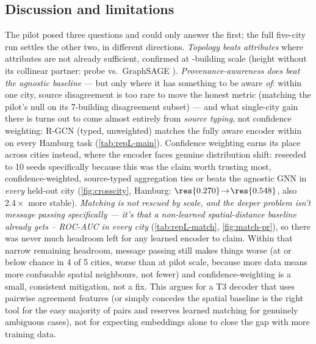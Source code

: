 \subsection{Discussion and limitations}
\label{sec:repL:discussion}
The pilot posed three questions and could only answer the first; the full
five-city run settles the other two, in different directions. \emph{Topology
beats attributes} where attributes are not already sufficient, confirmed at
-building scale (height without its collinear partner: probe
 vs.\ GraphSAGE ). \emph{Provenance-awareness does beat
the agnostic baseline} --- but only where it has something to be aware
\emph{of}: within one city, source disagreement is too rare to move the
honest metric (matching the pilot's null on its 7-building disagreement
subset) --- and what single-city gain there is turns out to come almost
entirely from \emph{source typing}, not confidence weighting: R-GCN (typed,
unweighted) matches the fully aware encoder within  on every Hamburg
task (\cref{tab:repL-main}). Confidence weighting earns its place across
cities instead, where the encoder faces genuine distribution shift: reseeded
to 10 seeds specifically because this was the claim worth trusting most,
confidence-weighted, source-typed aggregation ties or beats the agnostic GNN
in \emph{every} held-out city (\cref{fig:crosscity}, Hamburg:
$\res{0.270}\!\to\!\res{0.548}$, also $2.4\times$ more stable). \emph{Matching
is not rescued by scale, and the deeper problem isn't message passing
specifically --- it's that a non-learned spatial-distance baseline already
gets -- ROC-AUC in every city} (\cref{tab:repL-match},
\cref{fig:match-pr}), so there was never much headroom left for any learned
encoder to claim. Within that narrow remaining headroom, message passing still
makes things worse (at or below chance in 4 of 5 cities, worse than at pilot
scale, because more data means more confusable spatial neighbours, not fewer)
and confidence-weighting is a small, consistent mitigation, not a fix. This
argues for a T3 decoder that uses pairwise agreement features (or simply
concedes the spatial baseline is the right tool for the easy majority of
pairs and reserves learned matching for genuinely ambiguous cases), not for
expecting embeddings alone to close the gap with more training data.

